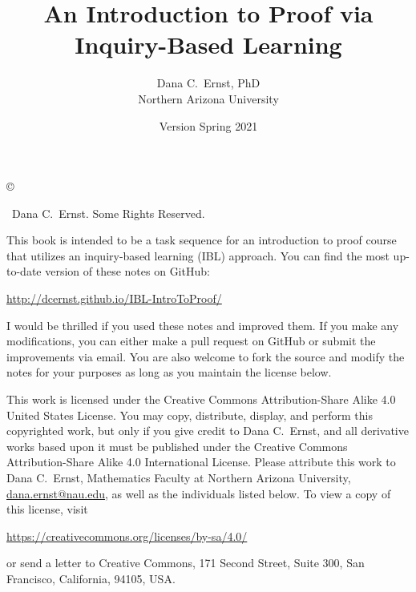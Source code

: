 \documentclass[12pt,oneside]{book}
\theoremstyle{definition}
\begin{document}
\title{An Introduction to Proof via \\Inquiry-Based Learning}
\author{Dana C.~Ernst, PhD\\
Northern Arizona University}
\date{Version Spring 2021}

\maketitle
\thispagestyle{empty}

\noindent\copyright{ \the\year\ Dana C.~Ernst.  Some Rights Reserved.\\

\bigskip

\noindent This book is intended to be a task sequence for an introduction to proof course that utilizes an inquiry-based learning (IBL) approach.  You can find the most up-to-date version of these notes on GitHub:
\begin{center}
\url{http://dcernst.github.io/IBL-IntroToProof/}
\end{center}
I would be thrilled if you used these notes and improved them. If you make any modifications, you can either make a pull request on GitHub or submit the improvements via email.  You are also welcome to fork the source and modify the notes for your purposes as long as you maintain the license below.

\bigskip

\noindent This work is licensed under the Creative Commons Attribution-Share Alike 4.0 United States License.  You may copy, distribute, display, and perform this copyrighted work, but only if you give credit to Dana C.~Ernst, and all derivative works based upon it must be published under the Creative Commons Attribution-Share Alike 4.0 International License. Please attribute this work to Dana C.~Ernst, Mathematics Faculty at Northern Arizona University, \url{dana.ernst@nau.edu}, as well as the individuals listed below. To view a copy of this license, visit
\begin{center}
\url{https://creativecommons.org/licenses/by-sa/4.0/}
\end{center}
or send a letter to Creative Commons, 171 Second Street, Suite 300, San Francisco, California, 94105, USA.}

\medskip

\begin{center}
\ccbysa
\end{center}

\bigskip
\end{document}
